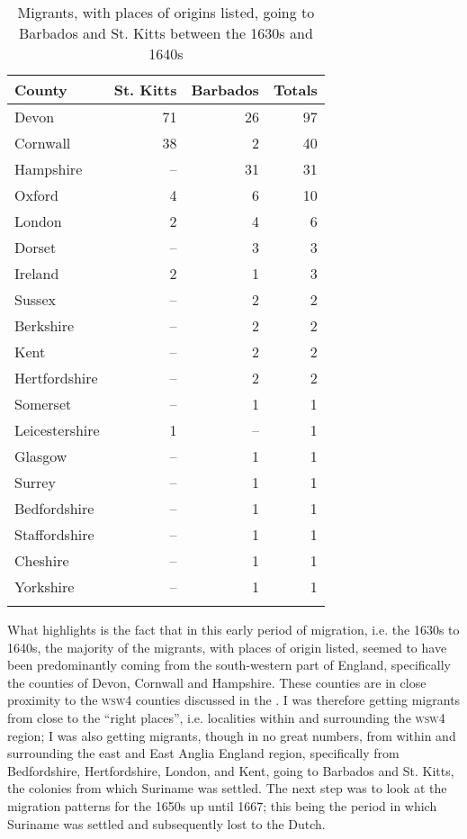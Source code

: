 \begin{table}
\begin{tabular}{lrrr}
\lsptoprule 
County & \multicolumn{1}{c}{St. Kitts} & \multicolumn{1}{c}{Barbados} & \multicolumn{1}{c}{Totals}\\
\midrule
Devon & 71 & 26 & 97 \\
Cornwall & 38 & 2 & 40 \\
Hampshire & -- & 31 & 31 \\
Oxford & 4 & 6 & 10 \\
London & 2 & 4 & 6 \\
Dorset & -- & 3 & 3 \\
Ireland & 2 & 1 & 3 \\
Sussex & -- & 2 & 2 \\
Berkshire & -- & 2 & 2 \\
Kent & -- & 2 & 2 \\
Hertfordshire & -- & 2 & 2 \\
Somerset & -- & 1 & 1 \\
Leicestershire & 1 & -- & 1 \\
Glasgow & -- & 1 & 1 \\
Surrey & -- & 1 & 1 \\
Bedfordshire & -- & 1 & 1 \\
Staffordshire & -- & 1 & 1 \\
Cheshire & -- & 1 & 1 \\
Yorkshire & -- & 1 & 1 \\
\lspbottomrule 
\end{tabular}
\caption{Migrants, with places of origins listed, going to Barbados and St. Kitts between the 1630s and 1640s}
\label{Table 6.2}
\end{table}

What  highlights is the fact that in this early period of migration, i.e. the 1630s to 1640s, the majority of the migrants, with places of origin listed, seemed to have been predominantly coming from the south-western part of England, specifically the counties of Devon, Cornwall and Hampshire. These counties are in close proximity to the \textsc{wsw4} counties discussed in the . I was therefore getting migrants from close to the ``right places'', i.e. localities within and surrounding the \textsc{wsw4} region; I was also getting migrants, though in no great numbers, from within and surrounding the east and East Anglia England region, specifically from Bedfordshire, Hertfordshire, London, and Kent, going to Barbados and St. Kitts, the colonies from which Suriname was settled. The next step was to look at the migration patterns for the 1650s up until 1667; this being the period in which Suriname was settled and subsequently lost to the Dutch.

